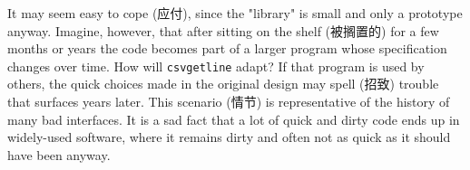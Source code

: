 It may seem easy to cope (应付), since the "library" is small and only a
prototype anyway. Imagine, however, that after sitting on the shelf
(被搁置的) for a few months or years the code becomes part of a larger
program whose specification changes over time. How will \verb'csvgetline'
adapt? If that program is used by others, the quick choices made in the
original design may spell (招致) trouble that surfaces years later. This
scenario (情节) is representative of the history of many bad interfaces. It
is a sad fact that a lot of quick and dirty code ends up in widely-used
software, where it remains dirty and often not as quick as it should have
been anyway.
